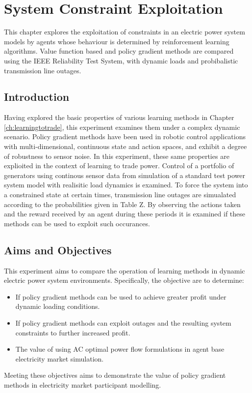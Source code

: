 \chapter{System Constraint Exploitation}
\label{ch:exploitation}
This chapter explores the exploitation of constraints in an electric power
system models by agents whose behaviour is determined by reinforcement learning
algorithms.  Value function based and policy gradient methods are compared
using the IEEE Reliability Test System, with dynamic loads and probibalistic
transmission line outages.

\section{Introduction}
Having explored the basic properties of various learning methods in Chapter
\ref{ch:learningtotrade}, this experiment examines them under a complex dynamic
scenario.  Policy gradient methods have been used in robotic control
applications with multi-dimensional, continuous state and action spaces, and
exhibit a degree of robustness to sensor noise.  In this experiment, these same
properties are explioited in the context of learning to trade power.  Control
of a portfolio of generators using continous sensor data from simulation of a
standard test power system model with realisitic load dynamics is examined.  To
force the system into a constrained state at certain times, transmission line
outages are simualated according to the probabilities given in Table Z.  By
observing the actions taken and the reward received by an agent during these
periods it is examined if these methods can be used to exploit such
occurances.

\section{Aims and Objectives}
This experiment aims to compare the operation of learning methods in dynamic
electric power system environments.  Specifically, the objective are to
determine:
\begin{itemize}
  \item If policy gradient methods can be used to achieve greater profit under
  dynamic loading conditions.
  \item If policy gradient methods can exploit outages and the resulting system
  constraints to further increased profit.
  \item The value of using AC optimal power flow formulations in agent base
  electricity market simulation.
\end{itemize}
Meeting these objectives aims to demonstrate the value of policy gradient
methods in electricity market participant modelling.

